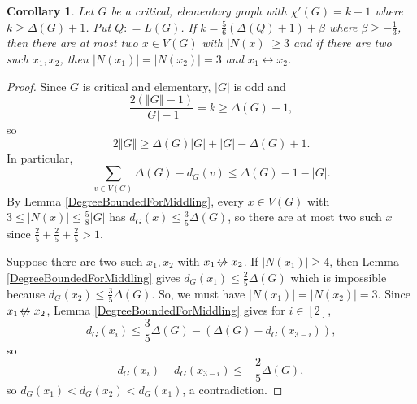 \documentclass[12pt]{amsart}
\theoremstyle{plain}
\newtheorem{cor}[thm]{Corollary}
\theoremstyle{definition}
\theoremstyle{remark}
\newcommand{\card}[1]{\left|#1\right|}
\newcommand{\size}[1]{\left\Vert#1\right\Vert}
\newcommand{\irange}[1]{\left[#1\right]}
\newcommand{\parens}[1]{\left( #1 \right)}
\newcommand{\DefinedAs}{\mathrel{\mathop:}=}
\def\adj{\leftrightarrow}
\def\nonadj{\not\!\leftrightarrow}
\begin{document}
\begin{cor}\label{CriticalElementary56}
Let $G$ be a critical, elementary graph with $\chi'(G) = k + 1$ where $k \ge \Delta(G) + 1$.  Put $Q \DefinedAs L(G)$. 
If $k = \frac56\parens{\Delta(Q) + 1} + \beta$ where $\beta \ge -\frac13$, then there are at most two $x \in V(G)$ with $\card{N(x)} \ge 3$
and if there are two such $x_1, x_2$, then $\card{N(x_1)} = \card{N(x_2)} = 3$ and $x_1 \adj x_2$.
\end{cor}
\begin{proof}
Since $G$ is critical and elementary, $\card{G}$ is odd and
\[\frac{2(\size{G} - 1)}{\card{G} - 1} = k \ge \Delta(G) + 1,\]
so
\[2\size{G} \ge \Delta(G)\card{G} + \card{G} - \Delta(G) + 1.\]
In particular,
\[\sum_{v \in V(G)} \Delta(G) - d_G(v) \le \Delta(G) - 1 - \card{G}.\]
By Lemma \ref{DegreeBoundedForMiddling}, every $x \in V(G)$ with $3 \le \card{N(x)} \le \frac58\card{G}$ has $d_G(x) \le \frac35\Delta(G)$, so there are at most two such $x$ since
$\frac25 + \frac25 + \frac25 > 1$.

Suppose there are two such $x_1, x_2$ with $x_1 \nonadj x_2$.  If $\card{N(x_1)} \ge 4$, then Lemma \ref{DegreeBoundedForMiddling} gives $d_G(x_1) \le \frac25\Delta(G)$ which is impossible because $d_G(x_2) \le \frac35\Delta(G)$.  So, we must have $\card{N(x_1)} = \card{N(x_2)} = 3$.  Since $x_1 \nonadj x_2$, Lemma \ref{DegreeBoundedForMiddling} gives for $i \in \irange{2}$,
\[d_G(x_i) \le \frac35\Delta(G) - (\Delta(G) - d_G(x_{3-i})),\]
so
\[d_G(x_i) - d_G(x_{3-i}) \le -\frac25\Delta(G),\]
so $d_G(x_1) < d_G(x_2) < d_G(x_1)$, a contradiction.
\end{proof}
\end{document}
